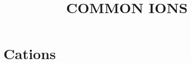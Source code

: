 \documentclass[12pt]{article}
\begin{document}
    \title{\uppercase{Common Ions}}
    \date{\vspace{-10ex}}

\maketitle
\thispagestyle{empty}

%
\section*{Cations}
\end{document}
